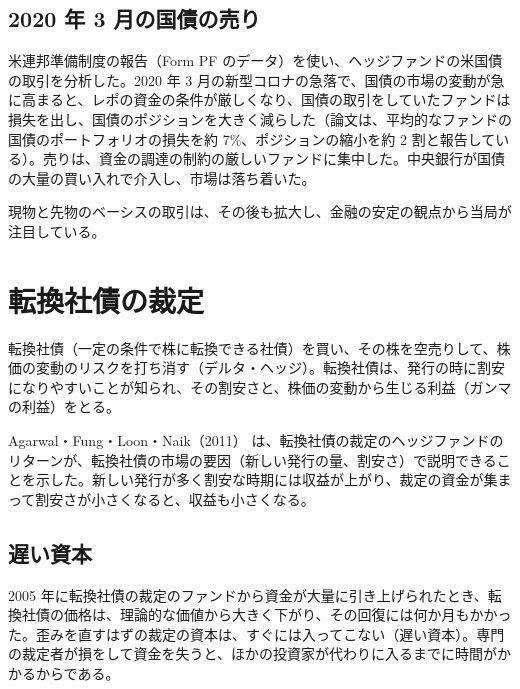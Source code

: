 \subsection{2020 年 3 月の国債の売り}

\begin{paperbox}
米連邦準備制度の報告（Form PF のデータ）を使い、ヘッジファンドの米国債の取引を分析した。2020 年 3 月の新型コロナの急落で、国債の市場の変動が急に高まると、レポの資金の条件が厳しくなり、国債の取引をしていたファンドは損失を出し、国債のポジションを大きく減らした（論文は、平均的なファンドの国債のポートフォリオの損失を約 7\%、ポジションの縮小を約 2 割と報告している）。売りは、資金の調達の制約の厳しいファンドに集中した。中央銀行が国債の大量の買い入れで介入し、市場は落ち着いた。
\end{paperbox}

現物と先物のベーシスの取引は、その後も拡大し、金融の安定の観点から当局が注目している。

\section{転換社債の裁定}

転換社債（一定の条件で株に転換できる社債）を買い、その株を空売りして、株価の変動のリスクを打ち消す（デルタ・ヘッジ）。転換社債は、発行の時に割安になりやすいことが知られ、その割安さと、株価の変動から生じる利益（ガンマの利益）をとる。

Agarwal・Fung・Loon・Naik（2011）\cite{aflm2011} は、転換社債の裁定のヘッジファンドのリターンが、転換社債の市場の要因（新しい発行の量、割安さ）で説明できることを示した。新しい発行が多く割安な時期には収益が上がり、裁定の資金が集まって割安さが小さくなると、収益も小さくなる。

\subsection{遅い資本}

\begin{paperbox}
2005 年に転換社債の裁定のファンドから資金が大量に引き上げられたとき、転換社債の価格は、理論的な価値から大きく下がり、その回復には何か月もかかった。歪みを直すはずの裁定の資本は、すぐには入ってこない（遅い資本）。専門の裁定者が損をして資金を失うと、ほかの投資家が代わりに入るまでに時間がかかるからである。
\end{paperbox}

